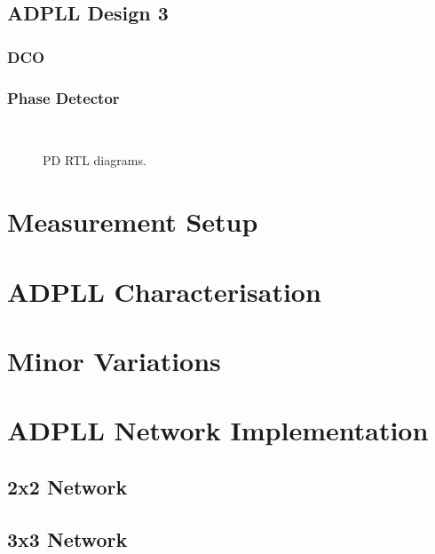 \subsection{\acs{ADPLL} Design 3}
\subsubsection{\acl{DCO}}
\subsubsection{Phase Detector}

\begin{figure}[h]
	\centering
	\\
	\caption[\acl{PD} RTL diagrams]{\acl{PD} RTL diagrams.}
	\label{fig:signum_impl}
\end{figure}

\section{Measurement Setup}\label{section:measurement_setup}

\section{\acs{ADPLL} Characterisation}

\section{Minor Variations}\label{section:minor_variations}

\section{\acs{ADPLL} Network Implementation}
\subsection{2x2 Network}
\subsection{3x3 Network}
